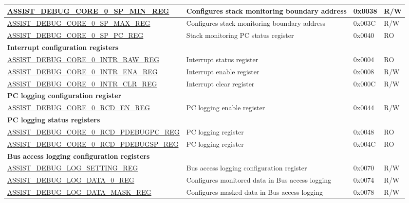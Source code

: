 \begin{longtable}{ | l| m{4cm} | l | l | }
\hyperref[regdesc:ASSISTDEBUGCORE0SPMINREG]{ASSIST\_DEBUG\_CORE\_0\_SP\_MIN\_REG} & Configures stack monitoring boundary address & 0x0038 & R/W \\ \hline
\hyperref[regdesc:ASSISTDEBUGCORE0SPMAXREG]{ASSIST\_DEBUG\_CORE\_0\_SP\_MAX\_REG} & Configures stack monitoring boundary address & 0x003C & R/W \\ \hline
\hyperref[regdesc:ASSISTDEBUGCORE0SPPCREG]{ASSIST\_DEBUG\_CORE\_0\_SP\_PC\_REG} & Stack monitoring PC status register & 0x0040 & RO \\ \hline
\multicolumn{4}{|l|}{\textbf{Interrupt configuration registers}} \\ \hline
\hyperref[regdesc:ASSISTDEBUGCORE0INTRRAWREG]{ASSIST\_DEBUG\_CORE\_0\_INTR\_RAW\_REG} & Interrupt status register & 0x0004 & RO \\ \hline
\hyperref[regdesc:ASSISTDEBUGCORE0INTRENAREG]{ASSIST\_DEBUG\_CORE\_0\_INTR\_ENA\_REG} & Interrupt enable register & 0x0008 & R/W \\ \hline
\hyperref[regdesc:ASSISTDEBUGCORE0INTRCLRREG]{ASSIST\_DEBUG\_CORE\_0\_INTR\_CLR\_REG} & Interrupt clear register & 0x000C & R/W \\ \hline
\multicolumn{4}{|l|}{\textbf{PC logging configuration register}} \\ \hline
\hyperref[regdesc:ASSISTDEBUGCORE0RCDENREG]{ASSIST\_DEBUG\_CORE\_0\_RCD\_EN\_REG} & PC logging enable register & 0x0044 & R/W \\ \hline
\multicolumn{4}{|l|}{\textbf{PC logging status registers}} \\ \hline
\hyperref[regdesc:ASSISTDEBUGCORE0RCDPDEBUGPCREG]{ASSIST\_DEBUG\_CORE\_0\_RCD\_PDEBUGPC\_REG} & PC logging register & 0x0048 & RO \\ \hline
\hyperref[regdesc:ASSISTDEBUGCORE0RCDPDEBUGSPREG]{ASSIST\_DEBUG\_CORE\_0\_RCD\_PDEBUGSP\_REG} & PC logging register & 0x004C & RO \\ \hline
\multicolumn{4}{|l|}{\textbf{Bus access logging configuration registers}} \\ \hline
\hyperref[regdesc:ASSISTDEBUGLOGSETTINGREG]{ASSIST\_DEBUG\_LOG\_SETTING\_REG} & Bus access logging configuration register & 0x0070 & R/W \\ \hline
\hyperref[regdesc:ASSISTDEBUGLOGDATA0REG]{ASSIST\_DEBUG\_LOG\_DATA\_0\_REG} & Configures monitored data in Bus access logging & 0x0074 & R/W \\ \hline
\hyperref[regdesc:ASSISTDEBUGLOGDATAMASKREG]{ASSIST\_DEBUG\_LOG\_DATA\_MASK\_REG} & Configures masked data in Bus access logging & 0x0078 & R/W \\ \hline

\end{longtable}
